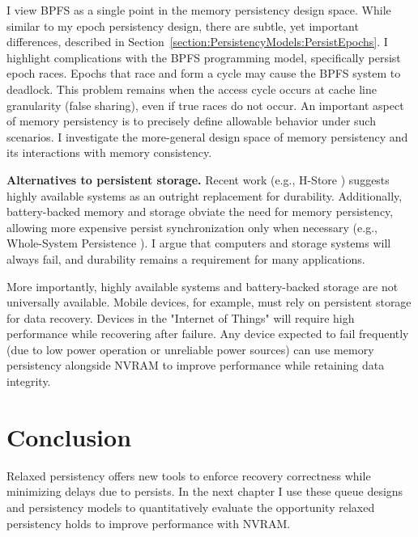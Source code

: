 I view BPFS as a single point in the memory persistency design space.
While similar to my epoch persistency design, there are subtle, yet important differences, described in Section~\ref{section:PersistencyModels:PersistEpochs}.
I highlight complications with the BPFS programming model, specifically persist epoch races.
Epochs that race and form a cycle may cause the BPFS system to deadlock.
This problem remains when the access cycle occurs at cache line granularity (false sharing), even if true races do not occur.
An important aspect of memory persistency is to precisely define allowable behavior under such scenarios.
I investigate the more-general design space of memory persistency and its interactions with memory consistency.

\textbf{Alternatives to persistent storage.}
Recent work (e.g., H-Store \cite{StonebrakerMadden07}) suggests highly available systems as an outright replacement for durability.
Additionally, battery-backed memory and storage obviate the need for memory persistency, allowing more expensive persist synchronization only when necessary (e.g., Whole-System Persistence \cite{NarayananHodson12}).
I argue that computers and storage systems will always fail, and durability remains a requirement for many applications.

More importantly, highly available systems and battery-backed storage are not universally available.
Mobile devices, for example, must rely on persistent storage for data recovery.
Devices in the "Internet of Things" will require high performance while recovering after failure.
Any device expected to fail frequently (due to low power operation or unreliable power sources) can use memory persistency alongside NVRAM to improve performance while retaining data integrity.

\section{Conclusion}
\label{sec:PersistencyModels:Conclusion}

Relaxed persistency offers new tools to enforce recovery correctness while minimizing delays due to persists.
In the next chapter I use these queue designs and persistency models to quantitatively evaluate the opportunity relaxed persistency holds to improve performance with NVRAM.
